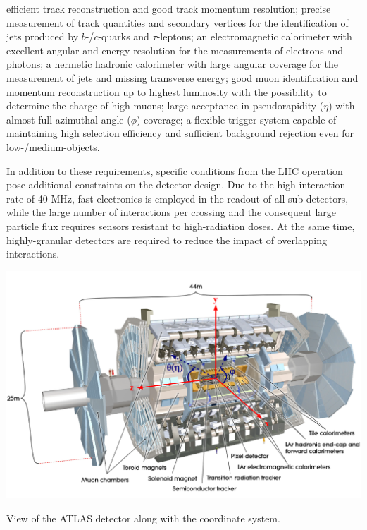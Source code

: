\bi
\ib efficient track reconstruction and good track momentum resolution;
\ib precise measurement of track quantities and secondary vertices for the identification of jets produced by $b$-/$c$-quarks and $\tau$-leptons;
\ib an electromagnetic calorimeter with excellent angular and energy resolution for the measurements of electrons and photons;
\ib a hermetic hadronic calorimeter with large angular coverage for the measurement of jets and missing transverse energy;
\ib good muon identification and momentum reconstruction up to highest luminosity with the possibility to determine the charge of high-\pT muons;
\ib large acceptance in pseudorapidity ($\eta$) with almost full azimuthal angle ($\phi$) coverage;
\ib a flexible trigger system capable of maintaining high selection efficiency and sufficient background rejection even for low-/medium-\pT objects.
\ei

In addition to these requirements, specific conditions from the LHC operation pose additional constraints on the detector design. Due to the high interaction rate of 40 MHz, fast electronics is employed in the readout of all sub detectors, while the large
number of interactions per crossing and the consequent large particle flux requires sensors resistant to high-radiation doses. At the same time, highly-granular detectors are required to reduce the impact of overlapping interactions.

\bfig[t!]
\includegraphics[width=1.1\textwidth]{figures/Detector/atlas_coordinates.png}
\captionsetup{width=0.85\textwidth} \caption{\small View of the ATLAS detector along with the coordinate system.}
\label{sec:det:fig:ATLAScoordinates}
\efig

